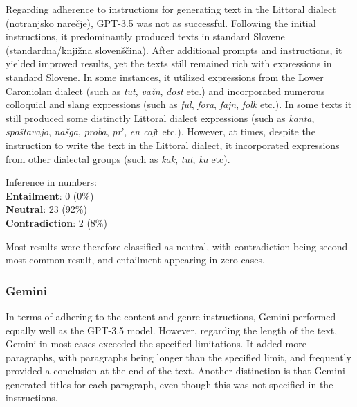 \documentclass[fleqn,moreauthors,10pt]{ds_report}
\begin{document}
    Regarding adherence to instructions for generating text in the Littoral dialect (notranjsko narečje), GPT-3.5 was not as successful. Following the initial instructions, it predominantly produced texts in standard Slovene (standardna/knjižna slovenščina). After additional prompts and instructions, it yielded improved results, yet the texts still remained rich with expressions in standard Slovene. In some instances, it utilized expressions from the Lower Caroniolan dialect (such as \textit{tut}, \textit{važn}, \textit{dost} etc.) and incorporated numerous colloquial and slang expressions (such as \textit{ful}, \textit{fora}, \textit{fajn}, \textit{folk} etc.). In some texts it still produced some distinctly Littoral dialect expressions (such as \textit{kanta}, \textit{spoštavajo}, \textit{našga}, \textit{proba}, \textit{pr}', \textit{en caj}t etc.). However, at times, despite the instruction to write the text in the Littoral dialect, it incorporated expressions from other dialectal groups (such as \textit{kak}, \textit{tut}, \textit{ka} etc).

\vspace{\baselineskip}
Inference in numbers:
\n\\ \textbf{Entailment}: 0 (0\%)
\textbf{\n\\Neutral}: 23 (92\%)
\textbf{\n\\Contradiction}: 2 (8\%)

\vspace{\baselineskip}
Most results were therefore classified as neutral, with contradiction being second-most common result, and entailment appearing in zero cases.


\subsubsection{Gemini}

    In terms of adhering to the content and genre instructions, Gemini performed equally well as the GPT-3.5 model. However, regarding the length of the text, Gemini in most cases exceeded the specified limitations. It added more paragraphs, with paragraphs being longer than the specified limit, and frequently provided a conclusion at the end of the text. Another distinction is that Gemini generated titles for each paragraph, even though this was not specified in the instructions. 
\end{document}
